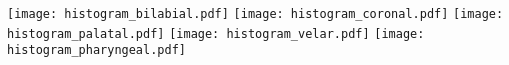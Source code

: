 \documentclass[varwidth=7in]{standalone}
\begin{document}
\texttt{[image: histogram\_bilabial.pdf]}%
\texttt{[image: histogram\_coronal.pdf]}%
\texttt{[image: histogram\_palatal.pdf]}%
\texttt{[image: histogram\_velar.pdf]}%
\texttt{[image: histogram\_pharyngeal.pdf]}
\end{document}
